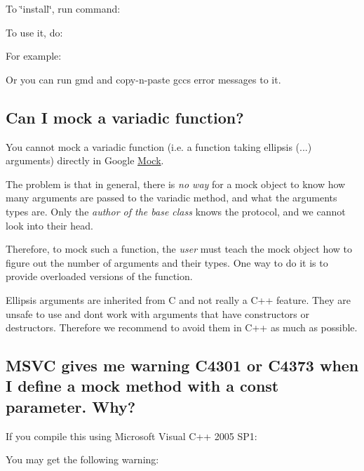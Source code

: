 To \char`\"{}install\char`\"{}, run command\+: 
\begin{DoxyCode}{0}
\end{DoxyCode}


To use it, do\+: 
\begin{DoxyCode}{0}
\end{DoxyCode}


For example\+: 
\begin{DoxyCode}{0}
\end{DoxyCode}


Or you can run {\ttfamily gmd} and copy-\/n-\/paste gcc\textquotesingle{}s error messages to it.

\subsection*{Can I mock a variadic function?}

You cannot mock a variadic function (i.\+e. a function taking ellipsis ({\ttfamily ...}) arguments) directly in Google \mbox{\hyperlink{class_mock}{Mock}}.

The problem is that in general, there is {\itshape no way} for a mock object to know how many arguments are passed to the variadic method, and what the arguments\textquotesingle{} types are. Only the {\itshape author of the base class} knows the protocol, and we cannot look into their head.

Therefore, to mock such a function, the {\itshape user} must teach the mock object how to figure out the number of arguments and their types. One way to do it is to provide overloaded versions of the function.

Ellipsis arguments are inherited from C and not really a C++ feature. They are unsafe to use and don\textquotesingle{}t work with arguments that have constructors or destructors. Therefore we recommend to avoid them in C++ as much as possible.

\subsection*{M\+S\+VC gives me warning C4301 or C4373 when I define a mock method with a const parameter. Why?}

If you compile this using Microsoft Visual C++ 2005 S\+P1\+: 
\begin{DoxyCode}{0}
\DoxyCodeLine{\};}
\DoxyCodeLine{}
\DoxyCodeLine{\};}
\end{DoxyCode}
 You may get the following warning\+: 
\begin{DoxyCode}{0}
\end{DoxyCode}


